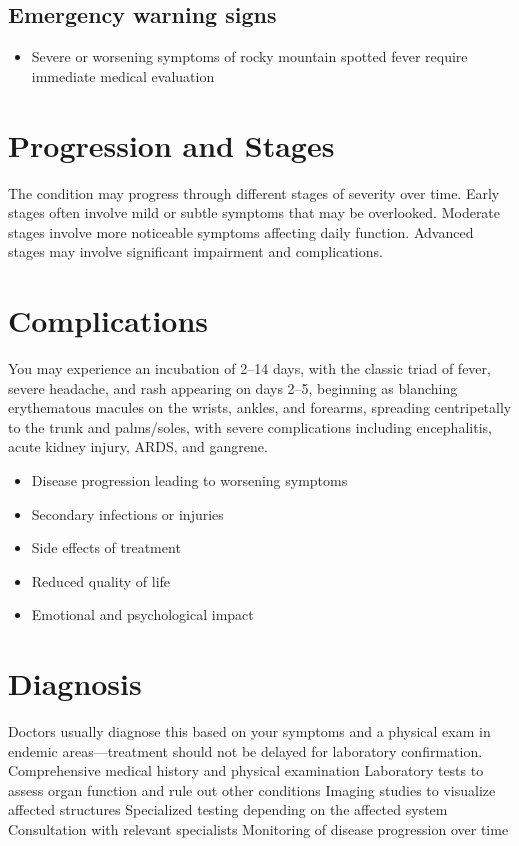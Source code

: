 \subsection{Emergency warning signs}
\begin{itemize}[noitemsep]
  \item Severe or worsening symptoms of rocky mountain spotted fever require immediate medical evaluation
\end{itemize}
\section{Progression and Stages}
The condition may progress through different stages of severity over time. Early stages often involve mild or subtle symptoms that may be overlooked. Moderate stages involve more noticeable symptoms affecting daily function. Advanced stages may involve significant impairment and complications.
\section{Complications}
You may experience an incubation of 2--14 days, with the classic triad of fever, severe headache, and rash appearing on days 2--5, beginning as blanching erythematous macules on the wrists, ankles, and forearms, spreading centripetally to the trunk and palms/soles, with severe complications including encephalitis, acute kidney injury, ARDS, and gangrene.

\begin{itemize}[noitemsep]
  \item Disease progression leading to worsening symptoms
  \item Secondary infections or injuries
  \item Side effects of treatment
  \item Reduced quality of life
  \item Emotional and psychological impact
\end{itemize}
\section{Diagnosis}
Doctors usually diagnose this based on your symptoms and a physical exam in endemic areas---treatment should not be delayed for laboratory confirmation. Comprehensive medical history and physical examination Laboratory tests to assess organ function and rule out other conditions Imaging studies to visualize affected structures Specialized testing depending on the affected system Consultation with relevant specialists Monitoring of disease progression over time

